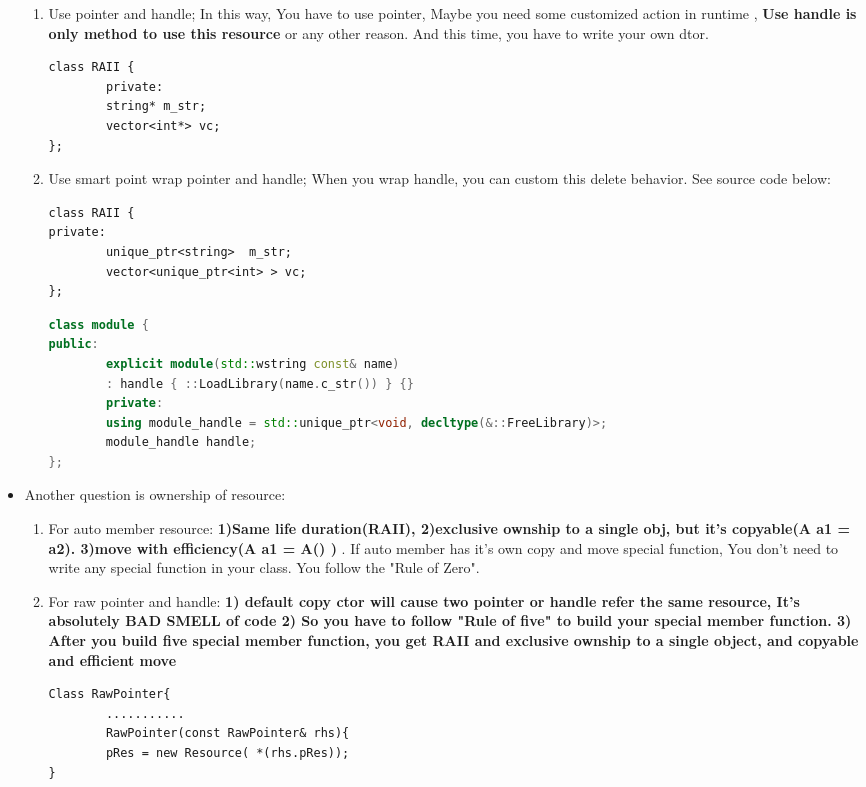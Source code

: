 \documentclass[a4paper,11pt,twoside]{book}
\begin{document}
\begin{itemize}
\begin{enumerate}
		\item Use pointer and handle; In this way, You have to use pointer, Maybe you need some customized action in runtime , \textbf{Use handle is only method to use this resource} or any other reason. And this time, you have to write your own dtor.
\begin{lstlisting}[numbers=none]
class RAII {
		private:
		string* m_str;
		vector<int*> vc;
};
\end{lstlisting}
		
		\item Use smart point wrap pointer and handle; When you wrap handle, you can custom this delete behavior. See source code below:
\begin{lstlisting}[numbers=none]
class RAII {
private:
		unique_ptr<string>  m_str;
		vector<unique_ptr<int> > vc;
};
\end{lstlisting}
		
\begin{lstlisting}[frame=single, language=c++]
class module {
public:
		explicit module(std::wstring const& name)
		: handle { ::LoadLibrary(name.c_str()) } {}
		private:
		using module_handle = std::unique_ptr<void, decltype(&::FreeLibrary)>;
		module_handle handle;
};
\end{lstlisting}
	\end{enumerate}
	
	\item Another question is ownership of resource:
	\begin{enumerate}
		\item For auto member resource: \textbf{1)Same life duration(RAII), 2)exclusive ownship to a single obj, but it's copyable(A a1 = a2).  3)move with efficiency(A a1 = A() ) }. If auto member has it's own copy and move special function, You don't need to write any special function in your class. You follow the "Rule of Zero".
		
		\item For raw pointer and handle: \textbf{1) default copy ctor will cause two pointer or handle refer the same resource, It's absolutely BAD SMELL of code 2) So you have to follow "Rule of five" to build your special member function. 3) After you build five special member function, you get RAII and exclusive ownship to a single object, and copyable and efficient move}
\begin{lstlisting}[numbers=none]
Class RawPointer{
		...........
		RawPointer(const RawPointer& rhs){
		pRes = new Resource( *(rhs.pRes));
}
		

\end{lstlisting}
\end{enumerate}
\end{itemize}
\end{document}
